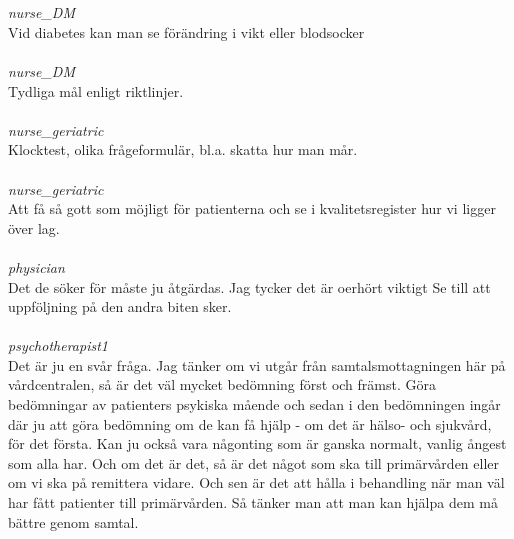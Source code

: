 \documentclass[12pt,a4paper,oneside]{article}
\begin{document}
\ \\\ \\
 { \it   nurse\_DM %
}\\
Vid diabetes kan man se f{\"o}r{\"a}ndring i vikt eller blodsocker %
\ \\\ \\
 { \it   nurse\_DM %
}\\
Tydliga m{\aa}l enligt riktlinjer. %
\ \\\ \\
 { \it   nurse\_geriatric %
}\\
Klocktest, olika fr{\aa}geformul{\"a}r, bl.a. skatta hur man m{\aa}r. %
\ \\\ \\
 { \it   nurse\_geriatric %
}\\
Att f{\aa} s{\aa} gott som m{\"o}jligt f{\"o}r patienterna och se i kvalitetsregister hur vi ligger {\"o}ver lag. %
\ \\\ \\
 { \it   physician %
}\\
Det de s{\"o}ker f{\"o}r m{\aa}ste ju {\aa}tg{\"a}rdas. Jag tycker det {\"a}r oerh{\"o}rt viktigt Se till att uppf{\"o}ljning p{\aa} den andra biten sker.  %
\ \\\ \\
 { \it   psychotherapist1 %
}\\
Det {\"a}r ju en sv{\aa}r fr{\aa}ga. Jag t{\"a}nker om vi utg{\aa}r fr{\aa}n samtalsmottagningen h{\"a}r p{\aa} v{\aa}rdcentralen, s{\aa} {\"a}r det v{\"a}l mycket bed{\"o}mning f{\"o}rst och fr{\"a}mst. G{\"o}ra bed{\"o}mningar av patienters psykiska m{\aa}ende och sedan i den bed{\"o}mningen ing{\aa}r d{\"a}r ju att g{\"o}ra bed{\"o}mning om de kan f{\aa} hj{\"a}lp - om det {\"a}r h{\"a}lso- och sjukv{\aa}rd, f{\"o}r det f{\"o}rsta. Kan ju ocks{\aa} vara n{\aa}gonting som {\"a}r ganska normalt, vanlig {\aa}ngest som alla har. Och om det {\"a}r det, s{\aa} {\"a}r det n{\aa}got som ska till prim{\"a}rv{\aa}rden eller om vi ska p{\aa} remittera vidare. Och sen {\"a}r det att h{\aa}lla i behandling n{\"a}r man v{\"a}l har f{\aa}tt patienter till prim{\"a}rv{\aa}rden. S{\aa} t{\"a}nker man att man kan hj{\"a}lpa dem m{\aa} b{\"a}ttre genom samtal. %
\end{document}
